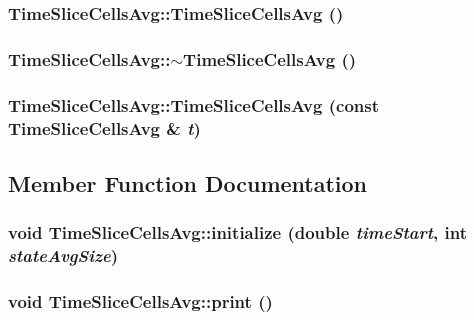 \subsubsection{\setlength{\rightskip}{0pt plus 5cm}TimeSliceCellsAvg::TimeSliceCellsAvg ()}\label{classTimeSliceCellsAvg_bbea3bc8f90af9c7a21bfe161b8b3782}


\subsubsection{\setlength{\rightskip}{0pt plus 5cm}TimeSliceCellsAvg::$\sim$TimeSliceCellsAvg ()}\label{classTimeSliceCellsAvg_61c34d56ddf14617a7a3f1d59a7c123e}


\subsubsection{\setlength{\rightskip}{0pt plus 5cm}TimeSliceCellsAvg::TimeSliceCellsAvg (const {\bf TimeSliceCellsAvg} \& {\em t})}\label{classTimeSliceCellsAvg_937eaad3d04d45b237f3c0348d273e57}




\subsection{Member Function Documentation}
\subsubsection{\setlength{\rightskip}{0pt plus 5cm}void TimeSliceCellsAvg::initialize (double {\em timeStart}, \/  int {\em stateAvgSize})}\label{classTimeSliceCellsAvg_700051de976002f1388c378ad7ee71ca}


\subsubsection{\setlength{\rightskip}{0pt plus 5cm}void TimeSliceCellsAvg::print ()}\label{classTimeSliceCellsAvg_90169cc38aafdaf0269a10f926289783}



